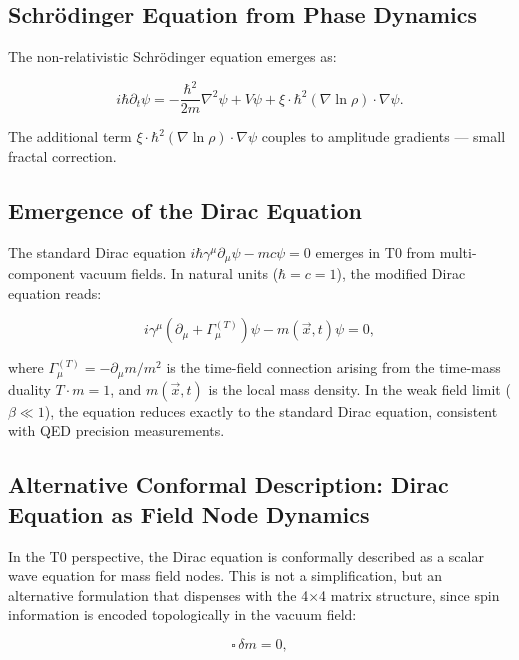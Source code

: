	\subsection*{Schrödinger Equation from Phase Dynamics}
	
	The non-relativistic Schrödinger equation emerges as:
	
	\begin{equation}
		i \hbar \partial_t \psi = -\frac{\hbar^2}{2m} \nabla^2 \psi + V \psi + \xi \cdot \hbar^2 (\nabla \ln \rho) \cdot \nabla \psi.
	\end{equation}
	
	The additional term \(\xi \cdot \hbar^2 (\nabla \ln \rho) \cdot \nabla \psi\) couples to amplitude gradients — small fractal correction.
	
	\subsection*{Emergence of the Dirac Equation}
	
	The standard Dirac equation \(i \hbar \gamma^\mu \partial_\mu \psi - m c \psi = 0\) emerges in T0 from multi-component vacuum fields. In natural units (\(\hbar = c = 1\)), the modified Dirac equation reads:
	
	\begin{equation}
		i\gamma^{\mu}(\partial_{\mu} + \Gamma_{\mu}^{(T)}) \psi - m(\vec{x},t) \psi = 0,
	\end{equation}
	
	where \(\Gamma_{\mu}^{(T)} = -\partial_{\mu} m / m^2\) is the time-field connection arising from the time-mass duality \(T \cdot m = 1\), and \(m(\vec{x},t)\) is the local mass density. In the weak field limit (\(\beta \ll 1\)), the equation reduces exactly to the standard Dirac equation, consistent with QED precision measurements.
	
	\subsection*{Alternative Conformal Description: Dirac Equation as Field Node Dynamics}
	
	In the T0 perspective, the Dirac equation is conformally described as a scalar wave equation for mass field nodes. This is not a simplification, but an alternative formulation that dispenses with the 4×4 matrix structure, since spin information is encoded topologically in the vacuum field:
	
	\begin{equation}
		\square \, \delta m = 0,
	\end{equation}
	

